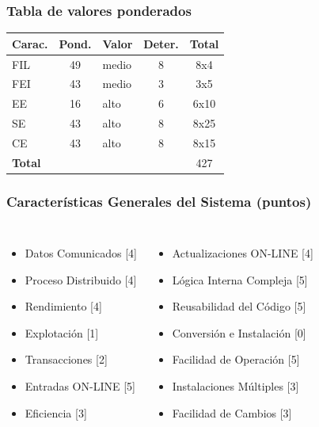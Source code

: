 \documentclass{beamer}
\begin{document}

\begin{frame}
\frametitle{Tabla de valores ponderados}
\begin{table}
\begin{tabular}{l c l c c}
\toprule
\textbf{Carac.} & \textbf{Pond.} & \textbf{Valor} & \textbf{Deter.} & \textbf{Total}\\
\midrule
FIL & 49 & medio & 8 & 8x4 \\
FEI	& 43 & medio & 3 &  3x5\\
EE 	& 16 & alto  & 6 &  6x10\\
SE 	& 43 & alto  & 8 &  8x25\\
CE	& 43 & alto  & 8 &  8x15\\
\textbf{Total} &&&   &  427\\
\bottomrule
\end{tabular}
\end{table}
\end{frame}


\begin{frame}
\frametitle{Características Generales del Sistema (puntos)}
\begin{columns}[c] %

\begin{itemize}
\item Datos Comunicados [4]
\item Proceso Distribuido [4]
\item Rendimiento [4]
\item Explotación [1]
\item Transacciones [2]
\item Entradas ON-LINE [5]
\item Eficiencia [3]
\end{itemize}

\begin{itemize}
\item Actualizaciones ON-LINE [4]
\item Lógica Interna Compleja [5]
\item Reusabilidad del Código [5]
\item Conversión e Instalación [0]
\item Facilidad de Operación [5]
\item Instalaciones Múltiples [3]
\item Facilidad de Cambios [3]
\end{itemize}

\end{columns}
\end{frame}
\end{document}
